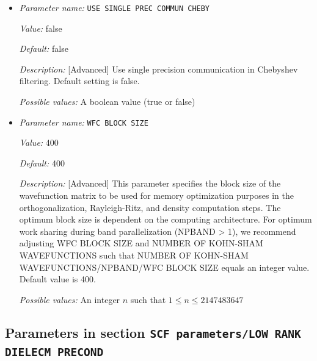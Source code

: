 \begin{itemize}
{\it Possible values:} A boolean value (true or false)
\item {\it Parameter name:} {\tt USE SINGLE PREC COMMUN CHEBY}
\label{parameters:SCF parameters/Eigen_2dsolver parameters/USE SINGLE PREC COMMUN CHEBY}
\label{parameters:SCF_20parameters/Eigen_2dsolver_20parameters/USE_20SINGLE_20PREC_20COMMUN_20CHEBY}


{\it Value:} false


{\it Default:} false


{\it Description:} [Advanced] Use single precision communication in Chebyshev filtering. Default setting is false.


{\it Possible values:} A boolean value (true or false)
\item {\it Parameter name:} {\tt WFC BLOCK SIZE}
\label{parameters:SCF parameters/Eigen_2dsolver parameters/WFC BLOCK SIZE}
\label{parameters:SCF_20parameters/Eigen_2dsolver_20parameters/WFC_20BLOCK_20SIZE}


{\it Value:} 400


{\it Default:} 400


{\it Description:} [Advanced]  This parameter specifies the block size of the wavefunction matrix to be used for memory optimization purposes in the orthogonalization, Rayleigh-Ritz, and density computation steps. The optimum block size is dependent on the computing architecture. For optimum work sharing during band parallelization (NPBAND > 1), we recommend adjusting WFC BLOCK SIZE and NUMBER OF KOHN-SHAM WAVEFUNCTIONS such that NUMBER OF KOHN-SHAM WAVEFUNCTIONS/NPBAND/WFC BLOCK SIZE equals an integer value. Default value is 400.


{\it Possible values:} An integer $n$ such that $1\leq n \leq 2147483647$
\end{itemize}

\subsection{Parameters in section \tt SCF parameters/LOW RANK DIELECM PRECOND}
\label{parameters:SCF_20parameters/LOW_20RANK_20DIELECM_20PRECOND}

